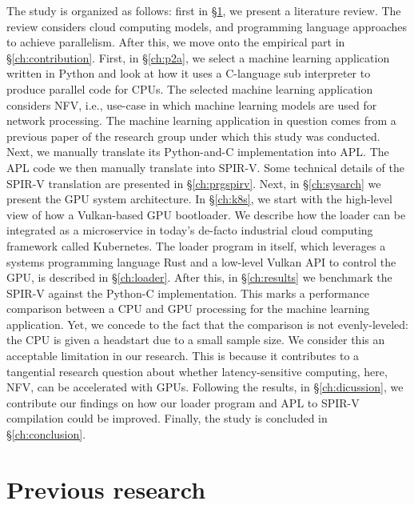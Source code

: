 \documentclass{IEEEtran}
\begin{document}
The study is organized as follows: first in §\ref{ch:bg}, we present a literature review. The review considers cloud computing models, and programming language approaches to achieve parallelism. After this, we move onto the empirical part in §\ref{ch:contribution}. First, in §\ref{ch:p2a}, we select a machine learning application written in Python and look at how it uses a C-language sub interpreter to produce parallel code for \glspl{CPU}. The selected machine learning application considers \gls{NFV}, i.e., use-case in which machine learning models are used for network processing. The machine learning application in question comes from a previous paper \cite{brissaud2019transparent} of the research group under which this study was conducted. Next, we manually translate its Python-and-C implementation into \gls{APL}. The APL code we then manually translate into \gls{SPIR-V}. Some technical details of the SPIR-V translation are presented in §\ref{ch:prgspirv}. Next, in §\ref{ch:sysarch} we present the \gls{GPU} system architecture. In §\ref{ch:k8s}, we start with the high-level view of how a Vulkan-based \gls{GPU} bootloader. We describe how the loader can be integrated as a microservice in today's de-facto industrial cloud computing framework called Kubernetes. The loader program in itself, which leverages a systems programming language Rust and a low-level Vulkan \gls{API} to control the \gls{GPU}, is described in §\ref{ch:loader}. After this, in §\ref{ch:results} we benchmark the \gls{SPIR-V} against the Python-C implementation. This marks a performance comparison between a CPU and GPU processing for the machine learning application. Yet, we concede to the fact that the comparison is not evenly-leveled: the CPU is given a headstart due to a small sample size. We consider this an acceptable limitation in our research. This is because it contributes to a tangential research question about whether latency-sensitive computing, here, \gls{NFV}, can be accelerated with \glspl{GPU}. Following the results, in §\ref{ch:dicussion}, we contribute our findings on how our loader program and APL to SPIR-V compilation could be improved.  Finally, the study is concluded in §\ref{ch:conclusion}.

\section{Previous research}
\label{ch:bg}
\end{document}
